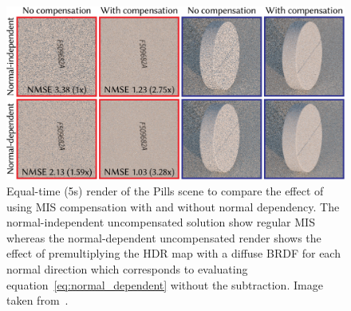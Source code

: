 \begin{figure}
    \centering
    \includegraphics[width=.6\textwidth]{images/pills.png}
    \caption{Equal-time (5s) render of the Pills scene to compare the effect of using MIS compensation with and without normal dependency.
    The normal-independent uncompensated solution show regular MIS
    whereas the normal-dependent uncompensated render shows the effect of premultiplying the HDR map with a diffuse BRDF for each normal direction
    which corresponds to evaluating equation~\ref{eq:normal_dependent} without the subtraction.
    Image taken from~\cite[Figure~9]{Karlik2019}.}
    \label{fig:pills}
\end{figure}